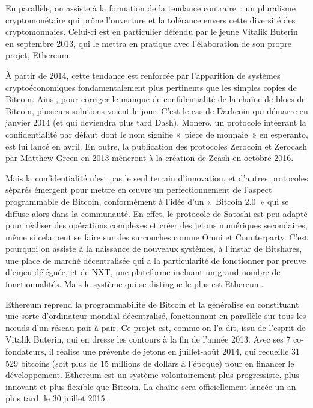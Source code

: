 En parallèle, on assiste à la formation de la tendance contraire~: un pluralisme cryptomonétaire qui prône l'ouverture et la tolérance envers cette diversité des cryptomonnaies. Celui-ci est en particulier défendu par le jeune Vitalik Buterin en septembre 2013, qui le mettra en pratique avec l'élaboration de son propre projet, Ethereum.

À partir de 2014, cette tendance est renforcée par l'apparition de systèmes cryptoéconomiques fondamentalement plus pertinents que les simples copies de Bitcoin. Ainsi, pour corriger le manque de confidentialité de la chaîne de blocs de Bitcoin, plusieurs solutions voient le jour. C'est le cas de Darkcoin qui démarre en janvier 2014 (et qui deviendra plus tard Dash). Monero, un protocole intégrant la confidentialité par défaut dont le nom signifie «~pièce de monnaie~» en esperanto, est lui lancé en avril. En outre, la publication des protocoles Zerocoin et Zerocash par Matthew Green en 2013 mèneront à la création de Zcash en octobre 2016.

Mais la confidentialité n'est pas le seul terrain d'innovation, et d'autres protocoles séparés émergent pour mettre en œuvre un perfectionnement de l'aspect programmable de Bitcoin, conformément à l'idée d'un «~Bitcoin 2.0~» qui se diffuse alors dans la communauté. En effet, le protocole de Satoshi est peu adapté pour réaliser des opérations complexes et créer des jetons numériques secondaires, même si cela peut se faire sur des surcouches comme Omni et Counterparty. C'est pourquoi on assiste à la naissance de nouveaux systèmes, à l'instar de Bitshares, une place de marché décentralisée qui a la particularité de fonctionner par preuve d'enjeu déléguée, et de NXT, une plateforme incluant un grand nombre de fonctionnalités. Mais le système qui se distingue le plus est Ethereum.

Ethereum reprend la programmabilité de Bitcoin et la généralise en constituant une sorte d'ordinateur mondial décentralisé, fonctionnant en parallèle sur tous les nœuds d'un réseau pair à pair. Ce projet est, comme on l'a dit, issu de l'esprit de Vitalik Buterin, qui en dresse les contours à la fin de l'année 2013. Avec ses 7 co-fondateurs, il réalise une prévente de jetons en juillet-août 2014, qui recueille 31 529 bitcoins (soit plus de 15 millions de dollars à l'époque) pour en financer le développement. Ethereum est un système volontairement plus progressiste, plus innovant et plus flexible que Bitcoin. La chaîne sera officiellement lancée un an plus tard, le 30 juillet 2015.

